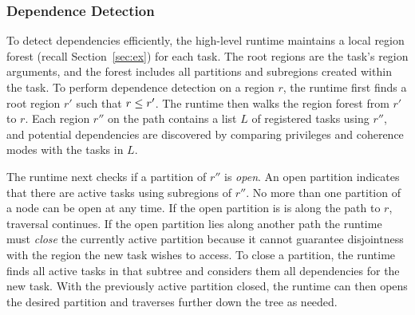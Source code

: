 

\subsubsection{Dependence Detection}
\label{subsec:depdetect}

To detect dependencies efficiently, the high-level runtime maintains a
local region forest (recall Section~\ref{sec:ex}) for each task.  The
root regions are the task's region arguments, and the forest includes
all partitions and subregions created within the task.  To perform
dependence detection on a region $r$, the runtime first finds a root
region $r'$ such that $r \leq r'$.  The runtime then walks the region
forest from $r'$ to $r$.  Each region $r''$ on the path contains a
list $L$ of registered tasks using $r''$, and potential dependencies
are discovered by comparing privileges and coherence modes with the
tasks in $L$.

The runtime next checks if a partition of $r''$ is {\em open}.  An
open partition indicates that there are active tasks using subregions
of $r''$.  No more than one partition of a node can be open
at any time.  If the open partition is is along the path to $r$,
traversal continues.  If the open partition lies along another 
path the runtime must {\em close} the currently active partition because it cannot guarantee
disjointness with the region the new task wishes to access.  To close a
partition, the runtime finds all active tasks in that
subtree and considers them all dependencies for the new task.  
With the previously active partition closed, the runtime can 
then opens the desired partition and traverses further down the tree as
needed.

